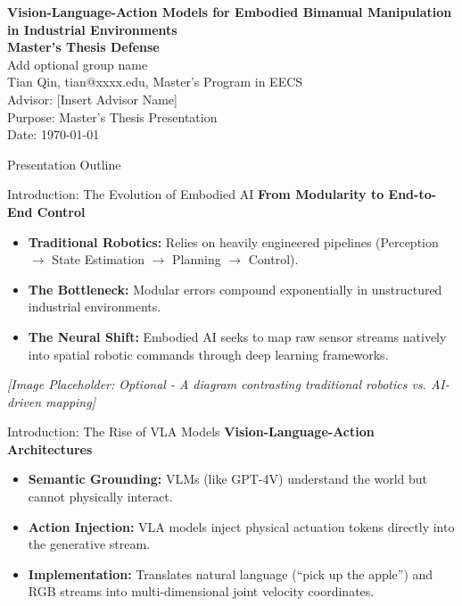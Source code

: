 \documentclass[aspectratio=169, t]{beamer}
\begin{document}
\begin{frame}[plain]
    \vspace*{1.5cm}
    {\huge \textbf{Vision-Language-Action Models for Embodied Bimanual Manipulation in Industrial Environments}} \\[0.8cm]
    {\Large \textbf{Master's Thesis Defense}} \\[1cm]
    
    {\large Add optional group name} \\
    {\large Tian Qin, tian@xxxx.edu, Master's Program in EECS} \\
    {\large Advisor: [Insert Advisor Name]} \\[0.8cm]
    
    {\large Purpose: Master's Thesis Presentation} \\
    {\large Date: \today}
\end{frame}

\begin{frame}{Presentation Outline}
    \tableofcontents
\end{frame}

\begin{frame}{Introduction: The Evolution of Embodied AI}
    {\Large \textbf{From Modularity to End-to-End Control}}
    \vspace{0.5cm}
    \begin{itemize}
        \item \textbf{Traditional Robotics:} Relies on heavily engineered pipelines (Perception $\rightarrow$ State Estimation $\rightarrow$ Planning $\rightarrow$ Control).
        \item \textbf{The Bottleneck:} Modular errors compound exponentially in unstructured industrial environments.
        \item \textbf{The Neural Shift:} Embodied AI seeks to map raw sensor streams natively into spatial robotic commands through deep learning frameworks.
    \end{itemize}
    \vspace{1cm}
    \textit{[Image Placeholder: Optional - A diagram contrasting traditional robotics vs. AI-driven mapping]}
\end{frame}

\begin{frame}{Introduction: The Rise of VLA Models}
    {\Large \textbf{Vision-Language-Action Architectures}}
    \vspace{0.5cm}
    \begin{itemize}
        \item \textbf{Semantic Grounding:} VLMs (like GPT-4V) understand the world but cannot physically interact. 
        \item \textbf{Action Injection:} VLA models inject physical actuation tokens directly into the generative stream.
        \item \textbf{Implementation:} Translates natural language (``pick up the apple'') and RGB streams into multi-dimensional joint velocity coordinates.
    \end{itemize}
\end{frame}
\end{document}
